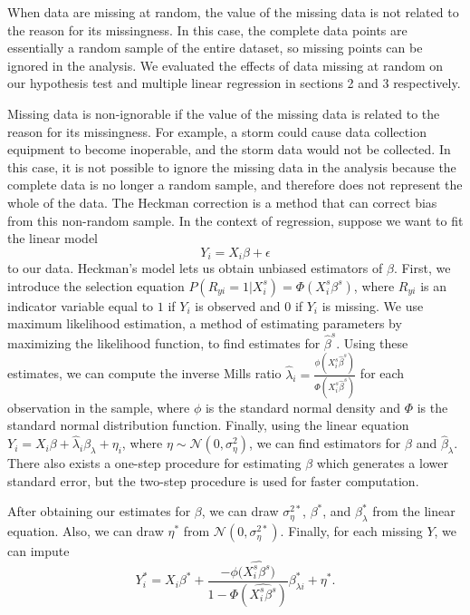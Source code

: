 When data are missing at random, the value of the missing data is not related to the reason for its missingness. In this case, the complete data points are essentially a random sample of the entire dataset, so missing points can be ignored in the analysis. We evaluated the effects of data missing at random on our hypothesis test and multiple linear regression in sections 2 and 3 respectively.

Missing data is non-ignorable if the value of the missing data is related to the reason for its missingness. For example, a storm could cause data collection equipment to become inoperable, and the storm data would not be collected. In this case, it is not possible to ignore the missing data in the analysis because the complete data is no longer a random sample, and therefore does not represent the whole of the data. The Heckman correction is a method that can correct bias from this non-random sample\cite{mnar}. In the context of regression, suppose we want to fit the linear model $$Y_{i} = X_{i}\beta+\epsilon$$ to our data. Heckman's model lets us obtain unbiased estimators of $\beta$. First, we introduce the selection equation $P(R_{yi} = 1 | X_{i}^{s}) = \Phi(X_{i}^{s}\beta^{s})$, where $R_{yi}$ is an indicator variable equal to $1$ if $Y_{i}$ is observed and $0$ if $Y_{i}$ is missing. We use maximum likelihood estimation, a method of estimating parameters by maximizing the likelihood function, to find estimates for $\hat{\beta}^{s}$. Using these estimates, we can compute the inverse Mills ratio $\hat{\lambda}_{i} = \frac{\phi(X_{i}^{s}\hat{\beta}^{s})}{\Phi(X_{i}^{s}\hat{\beta}^{s})}$ for each observation in the sample, where $\phi$ is the standard normal density and $\Phi$ is the standard normal distribution function. Finally, using the linear equation $Y_{i} = X_{i}\beta + \hat{\lambda}_{i}\beta_{\lambda} + \eta_{i}$, where $\eta \sim \mathcal{N}(0,\sigma_{\eta}^{2})$, we can find estimators for $\hat{\beta}$ and $\hat{\beta}_{\lambda}$. There also exists a one-step procedure for estimating $\beta$ which generates a lower standard error, but the two-step procedure is used for faster computation.

After obtaining our estimates for $\beta$, we can draw $\sigma_{\eta}^{2*}$, $\beta^{*}$, and $\beta_{\lambda}^{*}$ from the linear equation. Also, we can draw $\eta^{*}$ from $\mathcal{N}(0,\sigma_{\eta}^{2*})$. Finally, for each missing $Y$, we can impute $$Y_{i}^{*} = X_{i}\beta^{*} + \frac{-\phi(\widehat{X_{i}^{s}\beta^{s})}}{1-\Phi(\widehat{X_{i}^{s}\beta^{s}})}\beta_{\lambda i}^{*}+\eta^{*}.$$
